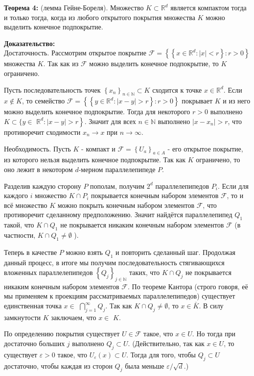 \documentclass[a4paper,12pt]{article} %
\begin{document}
\textbf{Теорема 4:} (лемма Гейне-Бореля). Множество $K \subset \mathbb{R}^{d}$ является компактом тогда и только тогда, когда из любого открытого покрытия множества $K$ можно выделить конечное подпокрытие.

\textbf{Доказательство:}\\
Достаточность. Рассмотрим открытое покрытие $\mathscr{F}=\left\{\left\{x \in \mathbb{R}^{d}:|x|<r\right\}: r>0\right\}$ множества $K$. Так как из $\mathscr{F}$ можно выделить конечное подпокрытие, то $K$ ограничено.

Пусть последовательность точек $\left\{x_{n}\right\}_{n \in \mathbb{N}} \subset K$ сходится к точке $x \in \mathbb{R}^{d}$. Если $x \notin K$, то семейство $\mathscr{F}=\left\{\left\{y \in \mathbb{R}^{d}:|x-y|>r\right\}: r>0\right\}$ покрывает $K$ и из него можно выделить конечное подпокрытие. Тогда для некоторого $r>0$ выполнено $K \subset\{y \in$ $\left.\mathbb{R}^{d}:|x-y|>r\right\}$. Значит для всех $n \in \mathbb{N}$ выполнено $\left|x-x_{n}\right|>r$, что противоречит сходимости $x_{n} \rightarrow x$ при $n \rightarrow \infty$.

Необходимость. Пусть $K$ - компакт и $\mathscr{F}=\left\{U_{a}\right\}_{a \in A}$ - его открытое покрытие, из которого нельзя выделить конечное подпокрытие. Так как $K$ ограничено, то оно лежит в некотором $d$-мерном параллелепипеде $P$.

Разделив каждую сторону $P$ пополам, получим $2^{d}$ параллелепипедов $P_{i}$. Если для каждого $i$ множество $K \cap P_{i}$ покрывается конечным набором элементов $\mathscr{F}$, то и всё множество $K$ можно покрыть конечным набором элементов $\mathscr{F}$, что противоречит сделанному предположению. Значит найдётся параллелепипед $Q_{1}$ такой, что $K \cap Q_{1}$ не покрывается никаким конечным набором элементов $\mathscr{F}$ (в частности, $K \cap Q_{1} \neq \emptyset$ ).

Теперь в качестве $P$ можно взять $Q_{1}$ и повторить сделанный шаг. Продолжая данный процесс, в итоге мы получим последовательность стягивающихся вложенных параллелепипедов $\left\{Q_{j}\right\}_{j \in \mathbb{N}}$ таких, что $K \cap Q_{j}$ не покрывается никаким конечным набором элементов $\mathscr{F}$. По теореме Кантора (строго говоря, её мы применяем к проекциям рассматриваемых параллелепипедов) существует единственная точка $x \in$ $\bigcap_{j=1}^{\infty} Q_{j}$. Так как $K \cap Q_{j} \neq \emptyset$, то $x \in \bar{K}$. В силу замкнутости $K$ заключаем, что $x \in$ $K$.

По определению покрытия существует $U \in \mathscr{F}$ такое, что $x \in U$. Но тогда при достаточно больших $j$ выполнено $Q_{j} \subset U$. (Действительно, так как $x \in U$, то существует $\varepsilon>0$ такое, что $U_{\varepsilon}(x) \subset U$. Тогда для того, чтобы $Q_{j} \subset U$ достаточно, чтобы каждая из сторон $Q_{j}$ была меньше $\varepsilon / \sqrt{d}$.)
\end{document}
